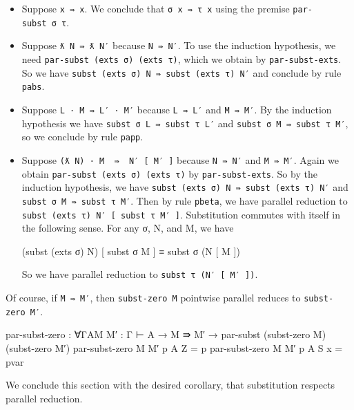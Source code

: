 \begin{itemize}
\item
  Suppose \texttt{x\ ⇛\ x}. We conclude that \texttt{σ\ x\ ⇛\ τ\ x}
  using the premise \texttt{par-subst\ σ\ τ}.
\item
  Suppose \texttt{ƛ\ N\ ⇛\ ƛ\ N′} because \texttt{N\ ⇛\ N′}. To use the
  induction hypothesis, we need
  \texttt{par-subst\ (exts\ σ)\ (exts\ τ)}, which we obtain by
  \texttt{par-subst-exts}. So we have
  \texttt{subst\ (exts\ σ)\ N\ ⇛\ subst\ (exts\ τ)\ N′} and conclude by
  rule \texttt{pabs}.
\item
  Suppose \texttt{L\ ·\ M\ ⇛\ L′\ ·\ M′} because \texttt{L\ ⇛\ L′} and
  \texttt{M\ ⇛\ M′}. By the induction hypothesis we have
  \texttt{subst\ σ\ L\ ⇛\ subst\ τ\ L′} and
  \texttt{subst\ σ\ M\ ⇛\ subst\ τ\ M′}, so we conclude by rule
  \texttt{papp}.
\item
  Suppose \texttt{(ƛ\ N)\ ·\ M\ \ ⇛\ \ N′\ {[}\ M′\ {]}} because
  \texttt{N\ ⇛\ N′} and \texttt{M\ ⇛\ M′}. Again we obtain
  \texttt{par-subst\ (exts\ σ)\ (exts\ τ)} by \texttt{par-subst-exts}.
  So by the induction hypothesis, we have
  \texttt{subst\ (exts\ σ)\ N\ ⇛\ subst\ (exts\ τ)\ N′} and
  \texttt{subst\ σ\ M\ ⇛\ subst\ τ\ M′}. Then by rule \texttt{pbeta}, we
  have parallel reduction to
  \texttt{subst\ (exts\ τ)\ N′\ {[}\ subst\ τ\ M′\ {]}}. Substitution
  commutes with itself in the following sense. For any σ, N, and M, we
  have

  \begin{myDisplay}
    (subst (exts σ) N) [ subst σ M ] ≡ subst σ (N [ M ])
  \end{myDisplay}

  So we have parallel reduction to
  \texttt{subst\ τ\ (N′\ {[}\ M′\ {]})}.
\end{itemize}

Of course, if \texttt{M\ ⇛\ M′}, then \texttt{subst-zero\ M} pointwise
parallel reduces to \texttt{subst-zero\ M′}.

\begin{fence}
\begin{code}
par-subst-zero : ∀{Γ}{A}{M M′ : Γ ⊢ A}
       → M ⇛ M′
       → par-subst (subst-zero M) (subst-zero M′)
par-subst-zero {M} {M′} p {A} {Z} = p
par-subst-zero {M} {M′} p {A} {S x} = pvar
\end{code}
\end{fence}

We conclude this section with the desired corollary, that substitution
respects parallel reduction.

